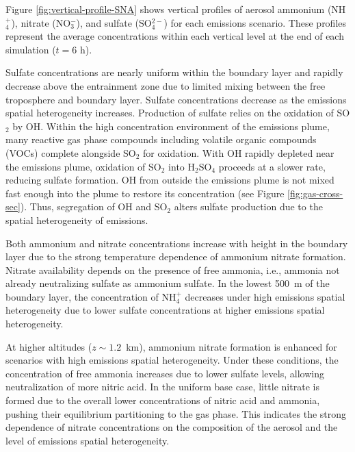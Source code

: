 \documentclass[journal abbreviation, manuscript]{copernicus}
\begin{document}
Figure \ref{fig:vertical-profile-SNA} shows vertical profiles of
aerosol ammonium (NH$_4^+$), nitrate (NO$_3^-$), and sulfate
(SO$_4^{2-}$) for each emissions scenario. These profiles represent
the average concentrations within each vertical level at the end of
each simulation ($t=6$ h).

Sulfate concentrations are nearly uniform within the boundary layer
and rapidly decrease above the entrainment zone due to limited mixing
between the free troposphere and boundary layer. Sulfate
concentrations decrease as the emissions spatial heterogeneity
increases. Production of sulfate relies on the oxidation of SO$_2$ by
OH. Within the high concentration environment of the emissions plume,
many reactive gas phase compounds including volatile organic compounds
(VOCs) complete alongside SO$_2$ for oxidation. With OH rapidly
depleted near the emissions plume, oxidation of SO$_2$ into
H$_2$SO$_4$ proceeds at a slower rate, reducing sulfate formation. OH
from outside the emissions plume is not mixed fast enough into the
plume to restore its concentration (see Figure
\ref{fig:gas-cross-sec}). Thus, segregation of OH and SO$_2$ alters
sulfate production due to the spatial heterogeneity of emissions.

Both ammonium and nitrate concentrations increase with height in the
boundary layer due to the strong temperature dependence of ammonium
nitrate formation. Nitrate availability depends on the presence of
free ammonia, i.e., ammonia not already neutralizing
sulfate as ammonium sulfate. In the lowest 500~m of the boundary
layer, the concentration of NH$_4^+$ decreases under high emissions
spatial heterogeneity due to lower
sulfate concentrations at higher emissions spatial
heterogeneity.  

At higher altitudes ($z\sim1.2$~km), ammonium nitrate formation is
enhanced for scenarios with high emissions spatial
heterogeneity. Under these conditions, the concentration of free
ammonia increases due to lower sulfate levels, allowing neutralization
of more nitric acid.  In the uniform base case, little nitrate is
formed due to the overall lower concentrations of nitric acid and
ammonia, pushing their equilibrium partitioning to the gas phase. This
indicates the strong dependence of nitrate concentrations on the
composition of the aerosol and the level of emissions spatial
heterogeneity.
\end{document}
